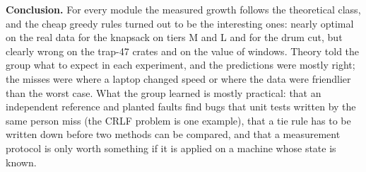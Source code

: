 \documentclass[11pt,a4paper]{article}
\begin{document}
\textbf{Conclusion.} For every module the measured growth follows the theoretical class, and the cheap greedy rules turned out to be the interesting ones: nearly optimal on the real data for the knapsack on tiers M and L and for the drum cut, but clearly wrong on the trap-47 crates and on the value of windows.
Theory told the group what to expect in each experiment, and the predictions were mostly right; the misses were where a laptop changed speed or where the data were friendlier than the worst case.
What the group learned is mostly practical: that an independent reference and planted faults find bugs that unit tests written by the same person miss (the CRLF problem is one example), that a tie rule has to be written down before two methods can be compared, and that a measurement protocol is only worth something if it is applied on a machine whose state is known.

\end{document}
